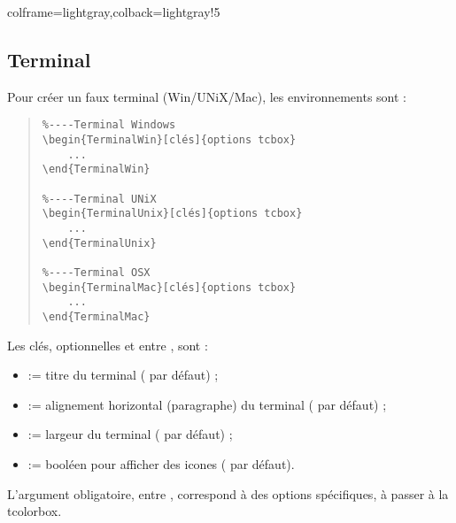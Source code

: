 \documentclass[11pt,a4paper]{ltxdoc}
\begin{document}
\begin{tcblisting}{colframe=lightgray,colback=lightgray!5}
\end{tcblisting}

\pagebreak

\subsection{Terminal}

Pour créer un \og faux \fg{} terminal (Win/UNiX/Mac), les environnements sont :

\begin{quote}
\begin{verbatim}
%----Terminal Windows
\begin{TerminalWin}[clés]{options tcbox}
    ...
\end{TerminalWin}

%----Terminal UNiX
\begin{TerminalUnix}[clés]{options tcbox}
    ...
\end{TerminalUnix}

%----Terminal OSX
\begin{TerminalMac}[clés]{options tcbox}
    ...
\end{TerminalMac}
\end{verbatim}
\end{quote}

Les \textsf{clés}, optionnelles et entre \MontreCode{[...]}, sont :

\begin{itemize}
	\item {} := titre du terminal ( par défaut) ;
	\item {} := alignement horizontal (paragraphe) du terminal ( par défaut) ;
	\item {} := largeur du terminal ( par défaut) ;
	\item {} := booléen pour afficher des icones ( par défaut).
\end{itemize}

\medskip

L'argument obligatoire, entre , correspond à des options spécifiques, à passer à la \textsf{tcolorbox}.
\end{document}
